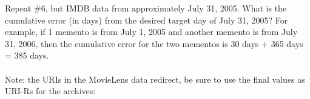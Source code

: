 Repeat \#6, but IMDB data from approximately July 31, 2005.  What
is the cumulative error (in days) from the desired target day of
July 31, 2005?  For example, if 1 memento is from July 1, 2005 and 
another memento is from July 31, 2006, then the cumulative error 
for the two mementos is 30 days $+$ 365 days = 385 days.\\
\\
Note: the URIs in the MovieLens data redirect, be sure to use
the final values as URI-Rs for the archives:
